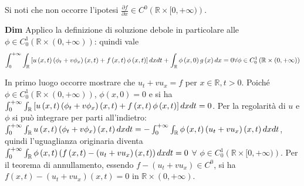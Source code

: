 \documentclass{article}
\begin{document}
Si noti che non occorre l'ipotesi $\frac{\partial f}{\partial x}\in
C^{0}\left( 
\mathbb{R}
\times \lbrack 0,+\infty )\right) $.

\textbf{Dim} Applico la definizione di soluzione debole in particolare alle $%
\phi \in C_{0}^{1}\left( 
\mathbb{R}
\times (0,+\infty )\right) $: quindi vale 
\begin{equation*}
\int_{0}^{+\infty }\int_{%
\mathbb{R}
}\left[ u\left( x,t\right) \left( \phi _{t}+v\phi _{x}\right) \left(
x,t\right) +f\left( x,t\right) \phi \left( x,t\right) \right] dxdt+\int_{%
\mathbb{R}
}\phi \left( x,0\right) g\left( x\right) dx=0 \forall \phi \in
C_{0}^{1}\left( 
\mathbb{R}
\times (0,+\infty )\right)
\end{equation*}

In primo luogo occorre mostrare che $u_{t}+vu_{x}=f$ per $x\in 
\mathbb{R}
,t>0$. Poich\'{e} $\phi \in C_{0}^{1}\left( 
\mathbb{R}
\times (0,+\infty )\right) $, $\phi \left( x,0\right) =0$ e si ha $%
\int_{0}^{+\infty }\int_{%
\mathbb{R}
}\left[ u\left( x,t\right) \left( \phi _{t}+v\phi _{x}\right) \left(
x,t\right) +f\left( x,t\right) \phi \left( x,t\right) \right] dxdt=0$. Per
la regolarit\`{a} di $u$ e $\phi $ si pu\`{o} integrare per parti
all'indietro: $\int_{0}^{+\infty }\int_{%
\mathbb{R}
}u\left( x,t\right) \left( \phi _{t}+v\phi _{x}\right) \left( x,t\right)
dxdt=-\int_{0}^{+\infty }\int_{%
\mathbb{R}
}\phi \left( x,t\right) \left( u_{t}+vu_{x}\right) \left( x,t\right) dxdt$,
quindi l'uguaglianza originaria diventa $\int_{0}^{+\infty }\int_{%
\mathbb{R}
}\phi \left( x,t\right) \left( f\left( x,t\right) -\left(
u_{t}+vu_{x}\right) \left( x,t\right) \right) dxdt=0$ $\forall $ $\phi \in
C_{0}^{1}\left( 
\mathbb{R}
\times \lbrack 0,+\infty )\right) $. Per il teorema di annullamento, essendo 
$f-\left( u_{t}+vu_{x}\right) \in C^{0}$, si ha $f\left( x,t\right) -\left(
u_{t}+vu_{x}\right) \left( x,t\right) =0$ in $%
\mathbb{R}
\times (0,+\infty )$.
\end{document}
